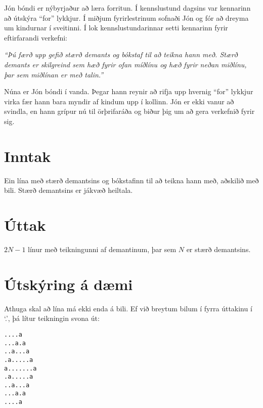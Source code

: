 

Jón bóndi er nýbyrjaður að læra forritun. Í kennslustund dagsins var kennarinn
að útskýra ``for'' lykkjur. Í miðjum fyrirlestrinum sofnaði Jón og
fór að dreyma um kindurnar í sveitinni. Í lok kennslustundarinnar setti
kennarinn fyrir eftirfarandi verkefni:

\textit{``Þú færð upp gefið stærð demants og bókstaf til að teikna hann með.
Stærð demants er skilgreind sem hæð fyrir ofan míðlínu og hæð fyrir neðan
miðlínu, þar sem miðlínan er með talin.''}

Núna er Jón bóndi í vanda. Þegar hann reynir að rifja upp hvernig ``for''
lykkjur virka fær hann bara myndir af kindum upp í kollinn. Jón er ekki vanur
að svindla, en hann grípur nú til örþrifaráða og biður þig um að gera verkefnið
fyrir sig.

\section*{Inntak}
Ein lína með stærð demantsins og bókstafinn til að teikna hann með, aðskilið
með bili. Stærð demantsins er jákvæð heiltala.

\section*{Úttak}
$2N - 1$ línur með teikningunni af demantinum, þar sem $N$ er stærð demantsins.


\section*{Útskýring á dæmi}
Athuga skal að lína má ekki enda á bili. Ef við breytum bilum í fyrra úttakinu
í `.', þá lítur teikningin svona út:

\begin{verbatim}
....a
...a.a
..a...a
.a.....a
a.......a
.a.....a
..a...a
...a.a
....a
\end{verbatim}

